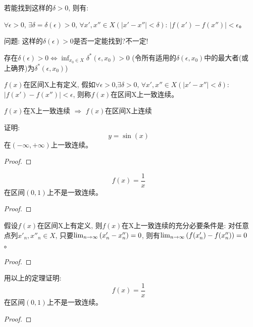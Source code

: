 \documentclass[lang=cn]{elegantbook}
\begin{document}
若能找到这样的$\delta > 0$, 则有:

$\forall \epsilon > 0$, $\exists \delta = \delta(\epsilon) > 0$, $\forall x', x'' \in X(\left| x' - x'' \right| < \delta)$: $\left| f(x') - f(x'') \right| < \epsilon$。

问题: 这样的$\delta(\epsilon) > 0$是否一定能找到?不一定!

存在$\delta(\epsilon) > 0 \Longleftrightarrow \inf_{x_0 \in X}\delta^*(\epsilon, x_0) > 0$ (令所有适用的$\delta(\epsilon, x_0)$中的最大者(或上确界)为$\delta^*(\epsilon, x_0)$)

\begin{definition}[一致连续]
    $f(x)$在区间X上有定义, 假如$\forall \epsilon > 0$,$\exists \delta > 0$, $\forall x', x'' \in X(\left| x' - x'' \right| < \delta)$: $\left| f(x') - f(x'') \right| < \epsilon$, 则称$f(x)$在区间X上一致连续。
\end{definition}
$f(x)$在X上一致连续 $\Rightarrow$ $f(x)$在区间X上连续

\begin{proposition}
    证明:
    \[ y = \sin(x) \]
    在$(-\infty, +\infty)$上一致连续。
\end{proposition}
\begin{proof}
    
\end{proof}

\begin{proposition}
    \[ f(x) = \frac{1}{x} \]
    在区间$(0, 1)$上不是一致连续。
\end{proposition}
\begin{proof}
    
\end{proof}

\begin{theorem}
    假设$f(x)$在区间X上有定义, 则$f(x)$在X上一致连续的充分必要条件是: 对任意点列$x'_n, x''_n \in X$, 只要$\lim_{n \to \infty } \left( x'_n - x''_n \right) = 0$, 则有$\lim_{n \to \infty } \left(f(x'_n) - f(x''_n) \right) = 0$。
\end{theorem}
\begin{proof}
    
\end{proof}

\begin{proposition}
    用以上的定理证明:
    \[ f(x) = \frac{1}{x} \]
    在区间$(0, 1)$上不是一致连续。
\end{proposition}
\begin{proof}
    
\end{proof}
\end{document}
